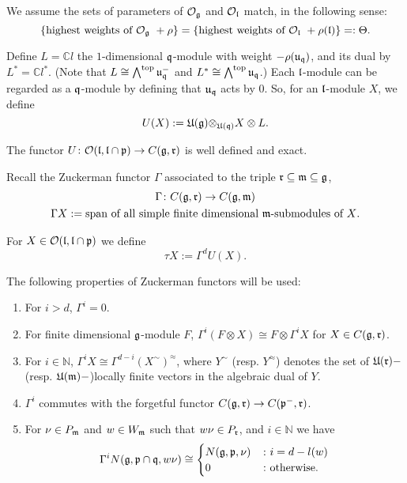 \documentclass[a4paper,10pt]{article}
\begin{document}
We assume the sets of parameters of $\mathcal{O}_{\mathfrak{g}}$ and $\mathcal{O}_{\mathfrak{l}}$ match, in the following sense:
%
\[
\{ \text{highest weights of $\mathcal{O}_{\mathfrak{g}}$} \ + \rho \} = \{ \text{highest weights of $\mathcal{O}_{\mathfrak{l}}$} \ + \rho(\mathfrak{l}) \} =: \Theta. 
\]

Define $L = \mathbb{C}l$ the $1$-dimensional $\mathfrak{q}$-module with weight $-\rho(\mathfrak{u}_{\mathfrak{q}})$, and its dual by $L^\ast = \mathbb{C}l^\ast$. (Note that $L \cong \bigwedge^\text{top} \mathfrak{u}_{\mathfrak{q}}^-$ and $L^\ast \cong \bigwedge^\text{top} \mathfrak{u}_{\mathfrak{q}}$.) Each $\mathfrak{l}$-module can be regarded as a $\mathfrak{q}$-module by defining that $\mathfrak{u}_{\mathfrak{q}}$ acts by $0$. So, for an $\mathfrak{l}$-module $X$, we define
%
\[ U(X) := \mathfrak{U(g)\otimes_{U(q)}} X \otimes L. \]

The functor $U \colon \mathcal{O}(\mathfrak{l},\mathfrak{l \cap p}) \to C(\mathfrak{g},\mathfrak{r})$ is well defined and exact.

Recall the Zuckerman functor $\Gamma$ associated to the triple $\mathfrak{r \subseteq m \subseteq g}$,
%
\begin{gather*}
\Gamma \colon C(\mathfrak{g,r}) \to  C(\mathfrak{g,m})  \\
\Gamma X := \text{span of all simple finite dimensional $\mathfrak{m}$-submodules of $X$}.
\end{gather*}

For $X \in \mathcal{O}(\mathfrak{l,l\cap p})$ we define
%
\[ \tau X := \Gamma^d U(X).\]

The following properties of Zuckerman functors will be used:

\begin{proposition}
\label{proposition:Zuckerman_properties}
\begin{enumerate}
\item \label{item:vanishing_above_d} For $i>d$, $\Gamma^i =0$.

\item \label{item:F_Gamma} For finite dimensional $\mathfrak{g}$-module $F$, $\Gamma^i(F \otimes X) \cong F \otimes \Gamma^i X$ for $X \in C(\mathfrak{g,r})$.

\item \label{item:easy_duality} For $i \in \mathbb{N}$, $\Gamma^i X \cong \Gamma^{d-i}(X^\sim)^\approx$, where $Y^\sim$ (resp. $Y^\approx$) denotes the set of $\mathfrak{U(r)}-$(resp. $\mathfrak{U(m)}-$)locally finite vectors in the algebraic dual of $Y$.

\item \label{item:restriction_p-} $\Gamma^i$ commutes with the forgetful functor $C(\mathfrak{g,r}) \to C(\mathfrak{p^-,r})$.

\item \label{item:Zuckerman_Vermas} For $\nu \in P_{\mathfrak{m}}$ and $w \in W_{\mathfrak{m}}$ such that $w \nu \in P_{\mathfrak{r}}$, and $i \in \mathbb{N}$ we have
%
\[ \Gamma^i N(\mathfrak{g,p\cap q},w\nu) \cong \begin{cases} N(\mathfrak{g,p},\nu) &\colon i=d-l(w)  \\ 0 &\colon \text{otherwise}. \end{cases} \]
\end{enumerate}
\end{proposition}
\end{document}
